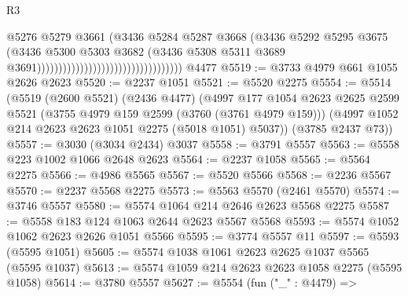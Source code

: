\begin{lexlean}{R3}
\begin{coremodule}
                                                                @5276
                                                                @5279
                                                                @3661
                                                                (@3436
                                                                  @5284
                                                                  @5287
                                                                  @3668
                                                                  (@3436
                                                                    @5292
                                                                    @5295
                                                                    @3675
                                                                    (@3436
                                                                      @5300
                                                                      @5303
                                                                      @3682
                                                                      (@3436
                                                                        @5308
                                                                        @5311
                                                                        @3689
                                                                        @3691))))))))))))))))))))))))))))))))))
    @4477
@5519 := @3733 @4979 @661 @1055 @2626 @2623
@5520 := @2237 @1051
@5521 := @5520 @2275
@5554 := @5514
    (@5519
      (@2600 @5521)
      (@2436 @4477)
      (@4997
        @177
        @1054
        @2623
        @2625
        @2599
        @5521
        (@3755 @4979 @159 @2599 (@3760 (@3761 @4979 @159)))
        (@4997 @1052 @214 @2623 @2623 @1051 @2275 (@5018 @1051) @5037))
      (@3785 @2437 @73))
@5557 := @3030 (@3034 @2434) @3037
@5558 := @3791 @5557
@5563 := @5558 @223 @1002 @1066 @2648 @2623
@5564 := @2237 @1058
@5565 := @5564 @2275
@5566 := @4986 @5565
@5567 := @5520 @5566
@5568 := @2236 @5567
@5570 := @2237 @5568 @2275
@5573 := @5563 @5570 (@2461 @5570)
@5574 := @3746 @5557
@5580 := @5574 @1064 @214 @2646 @2623 @5568 @2275
@5587 := @5558 @183 @124 @1063 @2644 @2623 @5567 @5568
@5593 := @5574 @1052 @1062 @2623 @2626 @1051 @5566
@5595 := @3774 @5557 @11
@5597 := @5593 (@5595 @1051)
@5605 := @5574 @1038 @1061 @2623 @2625 @1037 @5565 (@5595 @1037)
@5613 := @5574 @1059 @214 @2623 @2623 @1058 @2275 (@5595 @1058)
@5614 := @3780 @5557
@5627 := @5554
    (fun ("_" : @4479) =>

\end{coremodule}
\end{lexlean}
